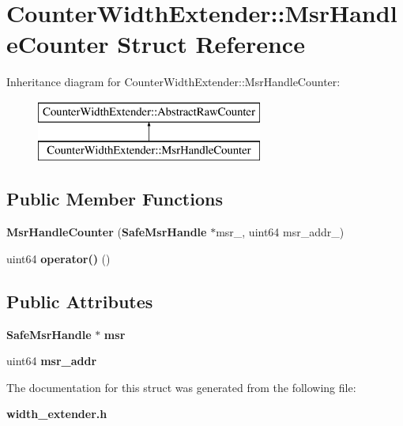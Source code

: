 \section{Counter\+Width\+Extender\+:\+:Msr\+Handle\+Counter Struct Reference}
\label{structCounterWidthExtender_1_1MsrHandleCounter}
Inheritance diagram for Counter\+Width\+Extender\+:\+:Msr\+Handle\+Counter\+:\begin{figure}[H]
\begin{center}
\leavevmode
\includegraphics[height=2.000000cm]{structCounterWidthExtender_1_1MsrHandleCounter}
\end{center}
\end{figure}
\subsection*{Public Member Functions}
\begin{DoxyCompactItemize}
\item 
{\bfseries Msr\+Handle\+Counter} ({\bf Safe\+Msr\+Handle} $\ast$msr\+\_\+, uint64 msr\+\_\+addr\+\_\+)\label{structCounterWidthExtender_1_1MsrHandleCounter_a885cd6b474abacc975199541499e10cc}

\item 
uint64 {\bfseries operator()} ()\label{structCounterWidthExtender_1_1MsrHandleCounter_af6a1d4c47ab99efc52e87805b20457fc}

\end{DoxyCompactItemize}
\subsection*{Public Attributes}
\begin{DoxyCompactItemize}
\item 
{\bf Safe\+Msr\+Handle} $\ast$ {\bfseries msr}\label{structCounterWidthExtender_1_1MsrHandleCounter_a073583b253e413a52377f8a8f0f5a79b}

\item 
uint64 {\bfseries msr\+\_\+addr}\label{structCounterWidthExtender_1_1MsrHandleCounter_a5522d6a788192c2cb69b8d0c4fc0a9a1}

\end{DoxyCompactItemize}


The documentation for this struct was generated from the following file\+:\begin{DoxyCompactItemize}
\item 
{\bf width\+\_\+extender.\+h}\end{DoxyCompactItemize}
